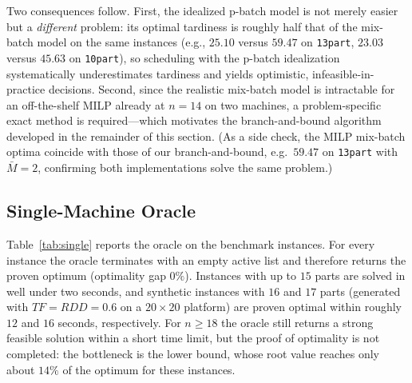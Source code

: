 \documentclass[review,3p,times,authoryear]{elsarticle}
\begin{document}
Two consequences follow. First, the idealized p-batch model is not merely easier
but a \emph{different} problem: its optimal tardiness is roughly half that of the
mix-batch model on the same instances (e.g., $25.10$ versus $59.47$ on
\texttt{13part}, $23.03$ versus $45.63$ on \texttt{10part}), so scheduling with
the p-batch idealization systematically underestimates tardiness and yields
optimistic, infeasible-in-practice decisions. Second, since the realistic
mix-batch model is intractable for an off-the-shelf MILP already at $n=14$ on two
machines, a problem-specific exact method is required---which motivates the
branch-and-bound algorithm developed in the remainder of this section. (As a
side check, the MILP mix-batch optima coincide with those of our
branch-and-bound, e.g.\ $59.47$ on \texttt{13part} with $\bar M=2$, confirming
both implementations solve the same problem.)

\subsection{Single-Machine Oracle}
\label{subsec:res_single}

Table~\ref{tab:single} reports the oracle on the benchmark instances. For every
instance the oracle terminates with an empty active list and therefore returns
the proven optimum (optimality gap $0\%$). Instances with up to $15$ parts are
solved in well under two seconds, and synthetic instances with $16$ and $17$
parts (generated with $TF=RDD=0.6$ on a $20\times20$ platform) are proven
optimal within roughly $12$ and $16$ seconds, respectively. For $n\ge 18$ the
oracle still returns a strong feasible solution within a short time limit, but
the proof of optimality is not completed: the bottleneck is the lower bound,
whose root value reaches only about $14\%$ of the optimum for these instances.
\end{document}
